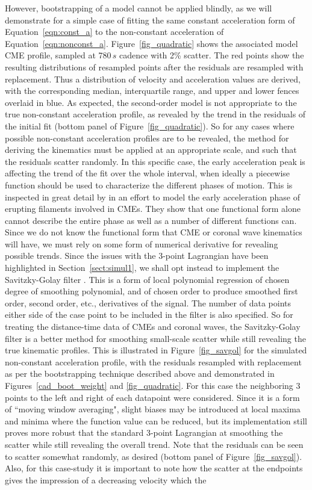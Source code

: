 \documentclass[structabstract]{aa}
\begin{document}
However, bootstrapping of a model cannot be applied blindly, as we will demonstrate for a simple case of fitting the same constant acceleration form of Equation~\ref{eqn:const_a} to the non-constant acceleration of Equation~\ref{eqn:nonconst_a}. Figure~\ref{fig_quadratic} shows the associated model CME profile, sampled at 780$\,s$ cadence with 2\% scatter. The red points show the resulting distributions of resampled points after the residuals are resampled with replacement. Thus a distribution of velocity and acceleration values are derived, with the corresponding median, interquartile range, and upper and lower fences overlaid in blue. As expected, the second-order model is not appropriate to the true non-constant acceleration profile, as revealed by the trend in the residuals of the initial fit (bottom panel of Figure~\ref{fig_quadratic}). So for any cases where possible non-constant acceleration profiles are to be revealed, the method for deriving the kinematics must be applied at an appropriate scale, and such that the residuals scatter randomly. In this specific case, the early acceleration peak is affecting the trend of the fit over the whole interval, when ideally a piecewise function should be used to characterize the different phases of motion. This is inspected in great detail by \citet{2008ApJ...674..586S} in an effort to model the early acceleration phase of erupting filaments involved in CMEs. They show that one functional form alone cannot describe the entire phase as well as a number of different functions can. Since we do not know the functional form that CME or coronal wave kinematics will have, we must rely on some form of numerical derivative for revealing possible trends. Since the issues with the 3-point Lagrangian have been highlighted in Section~\ref{sect:simul1}, we shall opt instead to implement the Savitzky-Golay filter \citep{Savitzky-Golay1964}. This is a form of local polynomial regression of chosen degree of smoothing polynomial, and of chosen order to produce smoothed first order, second order, etc., derivatives of the signal. The number of data points either side of the case point to be included in the filter is also specified. So for treating the distance-time data of CMEs and coronal waves, the Savitzky-Golay filter is a better method for smoothing small-scale scatter while still revealing the true kinematic profiles. This is illustrated in Figure~\ref{fig_savgol} for the simulated non-constant acceleration profile, with the residuals resampled with replacement as per the bootstrapping technique described above and demonstrated in Figures~\ref{cad_boot_weight} and \ref{fig_quadratic}. For this case the neighboring 3 points to the left and right of each datapoint were considered. Since it is a form of ``moving window averaging", slight biases may be introduced at local maxima and minima where the function value can be reduced, but its implementation still proves more robust that the standard 3-point Lagrangian at smoothing the scatter while still revealing the overall trend. Note that the residuals can be seen to scatter somewhat randomly, as desired (bottom panel of Figure~\ref{fig_savgol}). Also, for this case-study it is important to note how the scatter at the endpoints gives the impression of a decreasing velocity which the 
\end{document}
